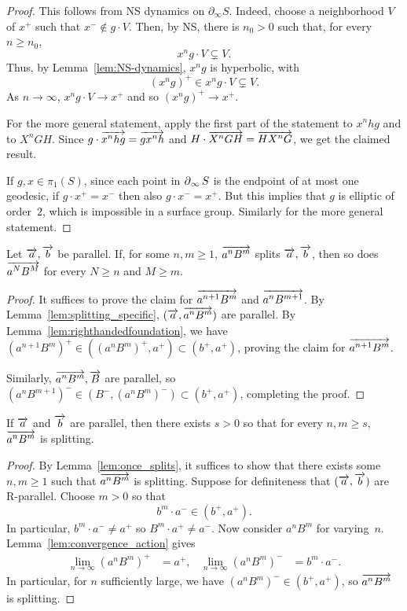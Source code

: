 \begin{proof}
This follows from NS dynamics on $\partial_\infty S$.
Indeed, choose a neighborhood $V$ of $x^+$ such that
$x^- \notin g \cdot V$. Then, by NS, there is
$n_0>0$ such that, for every $n \ge n_0$,
\[
x^n g \cdot V \subsetneq V.
\]
Thus, by Lemma~\ref{lem:NS-dynamics}, $x^n g$ is hyperbolic, with
\[
(x^n g)^+ \in x^n g \cdot V \subsetneq V.
\]
As $n \to \infty$, $x^n g \cdot V \to x^+$ and so $(x^n g)^+ \to x^+$.

For the more general statement, apply the first part of the statement
to $x^n hg$ and to $X^n GH$. Since
$g \cdot \overrightarrow{x^n hg} = \overrightarrow{g x^n h}$ and $H \cdot \overrightarrow{X^n GH} =
\overrightarrow{H X^n G}$, we get the claimed result.

If $g,x \in \pi_1(S)$, since each point in $\operatorname{\partial}_\infty S$ is the
endpoint of at most one geodesic, if $g \cdot x^+ = x^-$ then also $g
\cdot x^- = x^+$. But this implies that $g$ is elliptic of order~$2$,
which is impossible in a surface group. Similarly for the more general
statement.
\end{proof}


\begin{lemma}
\label{lem:once_splits}
Let $\overrightarrow{a},\overrightarrow{b}$ be parallel. If, for some $n,m \ge 1$,
$\overrightarrow{a^nB^m}$ splits $\overrightarrow{a},\overrightarrow{b}$, then so does
$\overrightarrow{a^NB^M}$ for every $N \geq n$ and $M \geq m$.
\end{lemma}
\begin{proof}
It suffices to prove the claim for $\overrightarrow{a^{n+1}B^m}$ and $\overrightarrow{a^nB^{m+1}}$.
By Lemma~\ref{lem:splitting_specific}, $(\overrightarrow{a}, \overrightarrow{a^n B^m})$ are
parallel. By Lemma~\ref{lem:righthandedfoundation}, we have
$(a^{n+1}B^m)^+ \in ((a^nB^m)^+, a^+) \subset (b^+, a^+)$, proving the
claim for $\overrightarrow{a^{n+1} B^m}$.

Similarly, $\overrightarrow{a^nB^m},\overrightarrow{B}$ are parallel, so $(a^nB^{m+1})^- \in
(B^-, (a^nB^m)^-) \subset (b^+,a^+)$, completing the proof.
\end{proof}

\begin{proposition}
If $\overrightarrow{a}$ and $\overrightarrow{b}$ are parallel, then there exists $s > 0$ so
that for every $n,m \ge s$, 
$\overrightarrow{a^n B^m}$ is splitting.
\label{prop:eventual_splitting}
\end{proposition}

\begin{proof}
By Lemma~\ref{lem:once_splits}, it suffices to show that there exists
some $n,m \geq 1$
such that $\overrightarrow{a^{n} B^{m}}$ is splitting.
Suppose for definiteness that $(\overrightarrow{a},\overrightarrow{b})$ are R-parallel.
Choose $m>0$ so that
\[
b^m \cdot a^- \in (b^+, a^+).
\]
In particular, $b^m \cdot a^- \ne a^+$ so $B^m \cdot a^+ \ne a^-$.
Now consider $a^n B^m$ for varying~$n$.
Lemma~\ref{lem:convergence_action} gives
\begin{align*}
\lim_{n \to \infty} (a^n B^m)^+ &= a^+, &
\lim_{n \to \infty} (a^n B^m)^- &= b^m \cdot a^-.
\end{align*}
In particular, for $n$ sufficiently large, we have
$(a^n B^m)^- \in (b^+, a^+)$,
so $\overrightarrow{a^n B^m}$ is splitting.
\end{proof}

